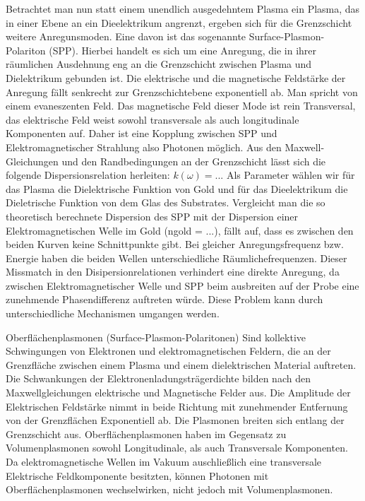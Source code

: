 \documentclass{article}
\begin{document}
Betrachtet man nun statt einem unendlich ausgedehntem Plasma ein Plasma, das in einer Ebene an ein Dieelektrikum angrenzt, ergeben sich für die Grenzschicht weitere Anregunsmoden. Eine davon ist das sogenannte Surface-Plasmon-Polariton (SPP). Hierbei handelt es sich um eine Anregung, die in ihrer räumlichen Ausdehnung eng an die Grenzschicht zwischen Plasma und Dielektrikum gebunden ist. Die elektrische und die magnetische Feldstärke der Anregung fällt senkrecht zur Grenzschichtebene exponentiell ab. Man spricht von einem evaneszenten Feld. Das magnetische Feld dieser Mode ist rein Transversal, das elektrische Feld weist sowohl transversale als auch longitudinale Komponenten auf. Daher ist eine Kopplung zwischen SPP und Elektromagnetischer Strahlung also Photonen möglich. Aus den Maxwell-Gleichungen und den Randbedingungen an der Grenzschicht lässt sich die folgende Dispersionsrelation herleiten: $k(\omega) = ...$ Als Parameter wählen wir für das Plasma die Dielektrische Funktion von Gold und für das Dieelektrikum die Dieletrische Funktion von dem Glas des Substrates. Vergleicht man die so theoretisch berechnete Dispersion des SPP mit der Dispersion einer Elektromagnetischen Welle im Gold (ngold = ...), fällt auf, dass es zwischen den beiden Kurven keine Schnittpunkte gibt. Bei gleicher Anregungsfrequenz bzw. Energie haben die beiden Wellen unterschiedliche Räumlichefrequenzen. Dieser Missmatch in den Disipersionrelationen verhindert eine direkte Anregung, da zwischen Elektromagnetischer Welle und SPP beim ausbreiten auf der Probe eine zunehmende Phasendifferenz auftreten würde. Diese Problem kann durch unterschiedliche Mechanismen umgangen werden. 



Oberflächenplasmonen (Surface-Plasmon-Polaritonen) Sind kollektive Schwingungen von Elektronen und elektromagnetischen Feldern, die an der Grenzfläche zwischen einem Plasma und einem dielektrischen Material auftreten. Die Schwankungen der Elektronenladungsträgerdichte bilden nach den Maxwellgleichungen elektrische und Magnetische Felder aus. Die Amplitude der Elektrischen Feldstärke nimmt in beide Richtung mit zunehmender Entfernung von der Grenzflächen Exponentiell ab. Die Plasmonen breiten sich entlang der Grenzschicht aus. Oberflächenplasmonen haben im Gegensatz zu Volumenplasmonen sowohl Longitudinale, als auch Transversale Komponenten. Da elektromagnetische Wellen im Vakuum auschließlich eine transversale Elektrische Feldkomponente besitzten, können Photonen mit Oberflächenplasmonen wechselwirken, nicht jedoch mit Volumenplasmonen.
\end{document}
